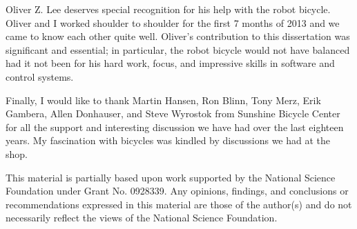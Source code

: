 Oliver Z. Lee deserves special recognition for his help with the robot bicycle.
Oliver and I worked shoulder to shoulder for the first 7 months of 2013 and we
came to know each other quite well. Oliver's contribution to this dissertation
was significant and essential; in particular, the robot bicycle would not have
balanced had it not been for his hard work, focus, and impressive skills in
software and control systems.

Finally, I would like to thank Martin Hansen, Ron Blinn, Tony Merz, Erik
Gambera, Allen Donhauser, and Steve Wyrostok from Sunshine Bicycle Center for
all the support and interesting discussion we have had over the last eighteen
years. My fascination with bicycles was kindled by discussions we had at the
shop.

This material is partially based upon work supported by the National Science
Foundation under Grant No. 0928339. Any opinions, findings, and conclusions or
recommendations expressed in this material are those of the author(s) and do
not necessarily reflect the views of the National Science Foundation.

